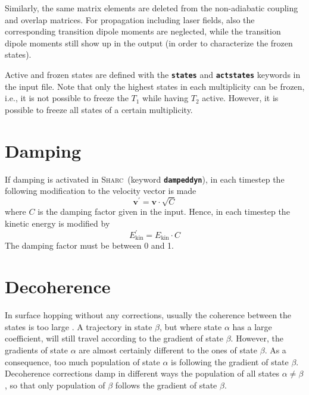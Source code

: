 \documentclass[a4paper,11pt,DIV=15,openany,twoside=false]{scrbook}
\newcommand{\sharc}{\textsc{Sharc}}
\newcommand{\ttt}[1]{\textbf{\texttt{#1}}}
\newcommand{\VEC}[1]{\ensuremath{\mathbf{#1}}}
\begin{document}
Similarly, the same matrix elements are deleted from the non-adiabatic coupling and overlap matrices. For propagation including laser fields, also the corresponding transition dipole moments are neglected, while the transition dipole moments still show up in the output (in order to characterize the frozen states).

Active and frozen states are defined with the \ttt{states} and \ttt{actstates} keywords in the input file. Note that only the highest states in each multiplicity can be frozen, i.e., it is not possible to freeze the $T_1$ while having $T_2$ active. However, it is possible to freeze all states of a certain multiplicity.


\section{Damping}\label{met:damping}

If damping is activated in \sharc\ (keyword \ttt{dampeddyn}), in each timestep the following modification to the velocity vector is made
\begin{equation}
  \VEC{v}^\prime=\VEC{v}\cdot\sqrt{C}
\end{equation}
where $C$ is the damping factor given in the input. Hence, in each timestep the kinetic energy is modified by
\begin{equation}
  E_{\text{kin}}^\prime=E_{\text{kin}}\cdot C
\end{equation}
The damping factor must be between 0 and 1.


\section{Decoherence}\label{met:decoherence}

In surface hopping without any corrections, usually the coherence between the states is too large \cite{Granucci2007JCP}. A trajectory in state $\beta$, but where state $\alpha$ has a large coefficient, will still travel according to the gradient of state $\beta$. However, the gradients of state $\alpha$ are almost certainly different to the ones of state $\beta$. As a consequence, too much population of state $\alpha$ is following the gradient of state $\beta$. Decoherence corrections damp in different ways the population of all states $\alpha\neq\beta$, so that only population of $\beta$ follows the gradient of state $\beta$.
\end{document}
